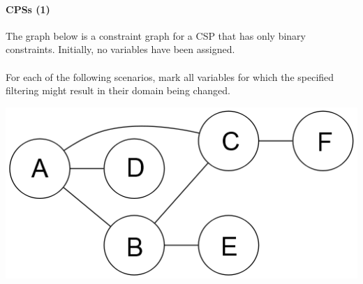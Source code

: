\paragraph{CPSs (1)}

The graph below is a constraint graph for a CSP that has only binary constraints. Initially, no variables have been assigned.
\\\\
For each of the following scenarios, mark all variables for which the specified filtering might result in their domain being changed. 

\begin{center}
    \includegraphics[scale=.43]{figures/domainFiltering.png}
\end{center}



